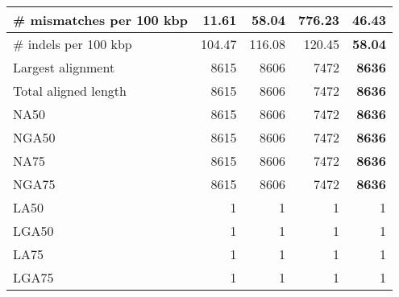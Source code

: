 \documentclass[12pt,a4paper]{article}
\begin{document}
\begin{table}[ht]
\begin{center}
\begin{tabular}{|l*{4}{|r}|}
\# mismatches per 100 kbp & {\bf 11.61} & 58.04 & 776.23 & 46.43 \\ \hline
\# indels per 100 kbp & 104.47 & 116.08 & 120.45 & {\bf 58.04} \\ \hline
Largest alignment & 8615 & 8606 & 7472 & {\bf 8636} \\ \hline
Total aligned length & 8615 & 8606 & 7472 & {\bf 8636} \\ \hline
NA50 & 8615 & 8606 & 7472 & {\bf 8636} \\ \hline
NGA50 & 8615 & 8606 & 7472 & {\bf 8636} \\ \hline
NA75 & 8615 & 8606 & 7472 & {\bf 8636} \\ \hline
NGA75 & 8615 & 8606 & 7472 & {\bf 8636} \\ \hline
LA50 & 1 & 1 & 1 & 1 \\ \hline
LGA50 & 1 & 1 & 1 & 1 \\ \hline
LA75 & 1 & 1 & 1 & 1 \\ \hline
LGA75 & 1 & 1 & 1 & 1 \\ \hline
\end{tabular}
\end{center}
\end{table}
\end{document}

